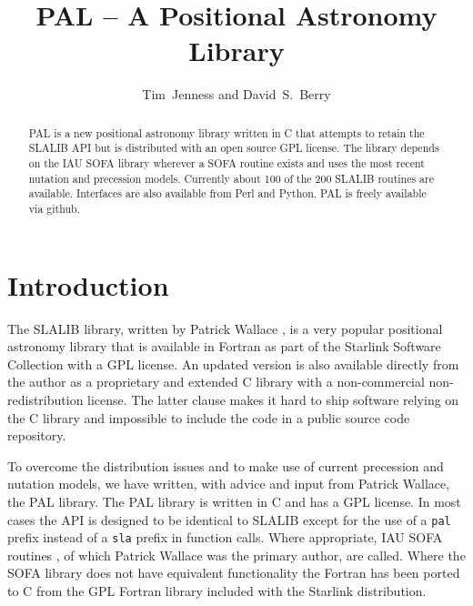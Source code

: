 
\resetcounters




\title{PAL -- A Positional Astronomy Library}
\author{Tim~Jenness and David~S.~Berry
}


\begin{abstract}
 PAL is a new positional astronomy library written in C that attempts to retain the SLALIB API but is distributed with an open source GPL license. The library depends on the IAU SOFA library wherever a SOFA routine exists and uses the most recent nutation and precession models. Currently about 100 of the 200 SLALIB routines are available. Interfaces are also available from Perl and Python. PAL is freely available via github.
\end{abstract}

\section{Introduction}

The SLALIB library, written by Patrick Wallace \citep{1994ASPC...61..481W}, is a very popular positional astronomy library that is available in Fortran as part of the Starlink Software Collection \citep[e.g.][]{2009ASPC..411..418J} with a GPL license. An updated version is also available directly from the author as a proprietary and extended C library with a non-commercial non-redistribution license. The latter clause makes it hard to ship software relying on the C library and impossible to include the code in a public source code repository.

To overcome the distribution issues and to make use of current precession and nutation models, we have written, with advice and input from Patrick Wallace, the PAL library. The PAL library is written in C and has a GPL license. In most cases the API is designed to be identical to SLALIB except for the use of a \texttt{pal} prefix instead of a \texttt{sla} prefix in function calls. Where appropriate, IAU SOFA routines \citep{Hohenkerk:2010,1996ASPC..101..207W}, of which Patrick Wallace was the primary author, are called. Where the SOFA library does not have equivalent functionality the Fortran has been ported to C from the GPL Fortran library included with the Starlink distribution.

